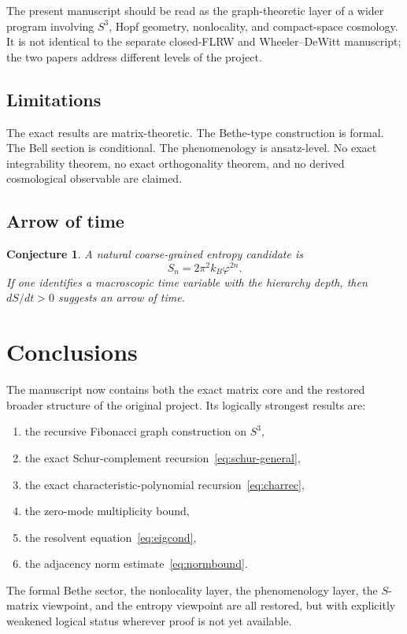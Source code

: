 \documentclass[
  aps,
  prd,
  reprint,
  superscriptaddress,
  nofootinbib,
  longbibliography,
  amsmath,
  amssymb
]{revtex4-2}
\newtheorem{conjecture}{Conjecture}
\theoremstyle{remark}
\newcommand{\Sthree}{S^{3}}
\newcommand{\phig}{\varphi}
\begin{document}
The present manuscript should be read as the graph-theoretic layer of a wider program involving $\Sthree$, Hopf geometry, nonlocality, and compact-space cosmology. It is not identical to the separate closed-FLRW and Wheeler--DeWitt manuscript; the two papers address different levels of the project.

\subsection{Limitations}

The exact results are matrix-theoretic. The Bethe-type construction is formal. The Bell section is conditional. The phenomenology is ansatz-level. No exact integrability theorem, no exact orthogonality theorem, and no derived cosmological observable are claimed.

\subsection{Arrow of time}

\begin{conjecture}
A natural coarse-grained entropy candidate is
\begin{equation}
S_n=2\pi^2k_B\phig^{2n}.
\label{eq:entropy}
\end{equation}
If one identifies a macroscopic time variable with the hierarchy depth, then $dS/dt>0$ suggests an arrow of time.
\end{conjecture}

\section{Conclusions}
\label{sec:conclusions}

The manuscript now contains both the exact matrix core and the restored broader structure of the original project. Its logically strongest results are:
\begin{enumerate}
    \item the recursive Fibonacci graph construction on $\Sthree$,
    \item the exact Schur-complement recursion~\eqref{eq:schur-general},
    \item the exact characteristic-polynomial recursion~\eqref{eq:charrec},
    \item the zero-mode multiplicity bound,
    \item the resolvent equation~\eqref{eq:eigcond},
    \item the adjacency norm estimate~\eqref{eq:normbound}.
\end{enumerate}
The formal Bethe sector, the nonlocality layer, the phenomenology layer, the $S$-matrix viewpoint, and the entropy viewpoint are all restored, but with explicitly weakened logical status wherever proof is not yet available.
\end{document}
